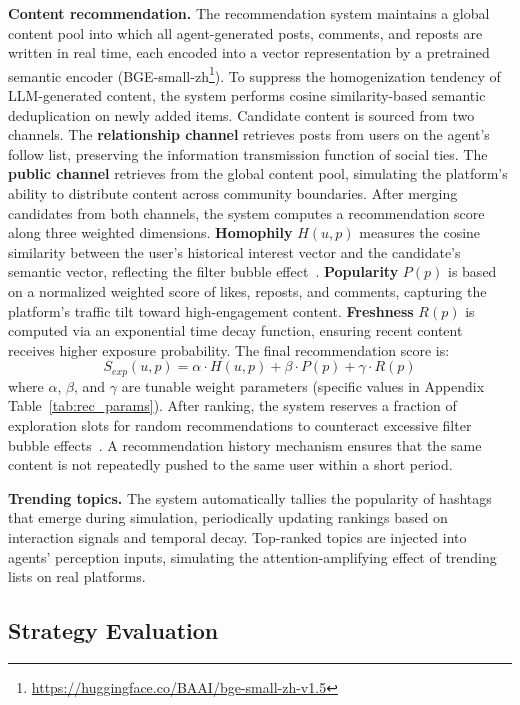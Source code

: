 \documentclass[a4paper,fleqn]{cas-dc}
\begin{document}
\textbf{Content recommendation.} The recommendation system maintains a global content pool into which all agent-generated posts, comments, and reposts are written in real time, each encoded into a vector representation by a pretrained semantic encoder (BGE-small-zh\footnote{\url{https://huggingface.co/BAAI/bge-small-zh-v1.5}}). To suppress the homogenization tendency of LLM-generated content, the system performs cosine similarity-based semantic deduplication on newly added items. Candidate content is sourced from two channels. The \textbf{relationship channel} retrieves posts from users on the agent's follow list, preserving the information transmission function of social ties. The \textbf{public channel} retrieves from the global content pool, simulating the platform's ability to distribute content across community boundaries. After merging candidates from both channels, the system computes a recommendation score along three weighted dimensions. \textbf{Homophily} $H(u,p)$ measures the cosine similarity between the user's historical interest vector and the candidate's semantic vector, reflecting the filter bubble effect~\citep{cinelli_echo_2021}. \textbf{Popularity} $P(p)$ is based on a normalized weighted score of likes, reposts, and comments, capturing the platform's traffic tilt toward high-engagement content. \textbf{Freshness} $R(p)$ is computed via an exponential time decay function, ensuring recent content receives higher exposure probability. The final recommendation score is:
\begin{equation}
S_{exp}(u, p) = \alpha \cdot H(u, p) + \beta \cdot P(p) + \gamma \cdot R(p)
\label{eq:recommend}
\end{equation}
where $\alpha$, $\beta$, and $\gamma$ are tunable weight parameters (specific values in Appendix Table~\ref{tab:rec_params}). After ranking, the system reserves a fraction of exploration slots for random recommendations to counteract excessive filter bubble effects~\citep{bail_opposing_2018}. A recommendation history mechanism ensures that the same content is not repeatedly pushed to the same user within a short period.

\textbf{Trending topics.} The system automatically tallies the popularity of hashtags that emerge during simulation, periodically updating rankings based on interaction signals and temporal decay. Top-ranked topics are injected into agents' perception inputs, simulating the attention-amplifying effect of trending lists on real platforms.

\subsection{Strategy Evaluation}\label{subsec:strategy}
\end{document}
